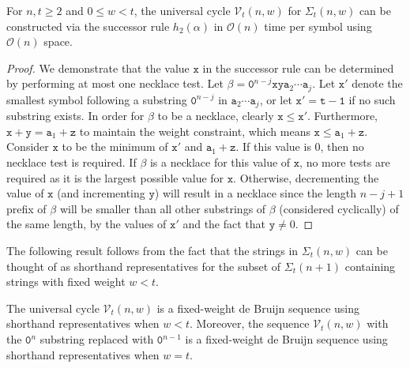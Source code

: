 \documentclass[US-letter,USenglish,authorcolumns,autoref]{lipics-v2021}
\renewcommand{\tt} {\mathtt}
\begin{document}
\begin{theorem} \label{thm:MSR}
For $n,t \geq  2$ and $0 \leq w < t$, the universal cycle $\mathcal{V}_t(n,w)$ for $\Sigma_t(n,w)$ can be constructed via the successor rule $h_2(\alpha)$ in $\mathcal{O}(n)$ time per symbol using $\mathcal{O}(n)$ space.
\end{theorem}
%
\begin{proof}  
We demonstrate that the value $\tt{x}$ in the successor rule can be determined by performing at most one necklace test.  Let $\beta = \tt{0}^{{n}-j}   \tt{x} \tt{y} \tt{a}_2\cdots \tt{a}_{j}$.
Let $\tt{x}'$ denote the smallest symbol following a substring $\tt{0}^{{n}-j}$ in $\tt{a}_2\cdots \tt{a}_{j}$, or let $\tt{x}'=\tt{t-1}$ if no such substring exists. In order for $\beta$ to be a necklace, clearly $\tt{x} \leq \tt{x}'$. 
Furthermore, $\tt{x} + \tt{y} = \tt{a}_1+\tt{z}$ to maintain the weight constraint, which means $\tt{x} \leq \tt{a}_1 + \tt{z}$.  Consider $\tt{x}$ to be the minimum of  $\tt{x}'$ and $\tt{a}_1 + \tt{z}$.  If this value is 0, then no necklace test is required.  If $\beta$ is a necklace for this value of $\tt{x}$, no more tests are required as it is the largest possible value for $\tt{x}$.  
Otherwise, decrementing the value of $\tt{x}$ (and incrementing $\tt{y}$) will result in a necklace since the length $n-j+1$ prefix of $\beta$ will be smaller than all other substrings of $\beta$ (considered cyclically) of the same length, by the values of $\tt{x}'$ and the fact that $\tt{y} \neq 0$.
\end{proof}


The following result follows from the fact that the strings in $\Sigma_t(n,w)$ can be thought of as shorthand representatives for the subset of $\Sigma_t(n+1)$ containing strings with fixed weight $w<t$.

\begin{theorem}
The universal cycle $\mathcal{V}_t(n,w)$ is a fixed-weight de Bruijn sequence using shorthand representatives when $w < t$.  Moreover, the sequence $\mathcal{V}_t(n,w)$ with the $\tt{0}^n$ substring replaced with $\tt{0}^{n-1}$ is a fixed-weight de Bruijn sequence using shorthand representatives when $w = t$.
\end{theorem}
\end{document}
